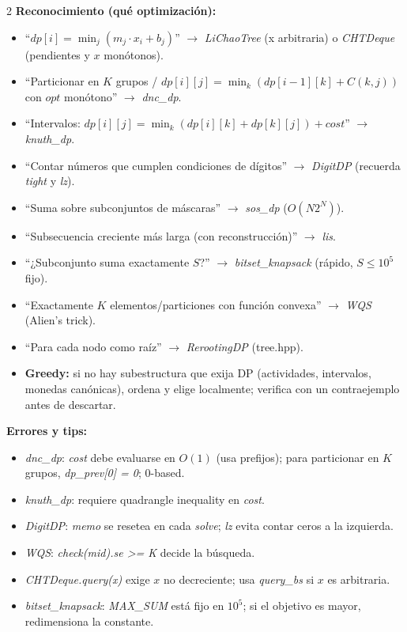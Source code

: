 \documentclass[10pt]{article}
\begin{document}
\begin{multicols}{2}
\textbf{Reconocimiento (qué optimización):}
\begin{itemize}\setlength{\itemsep}{1pt}
  \item ``$dp[i] = \min_j (m_j \cdot x_i + b_j)$'' $\to$ \textit{LiChaoTree} (x arbitraria) o \textit{CHTDeque} (pendientes y $x$ monótonos).
  \item ``Particionar en $K$ grupos / $dp[i][j] = \min_k (dp[i-1][k] + C(k,j))$ con $opt$ monótono'' $\to$ \textit{dnc\_dp}.
  \item ``Intervalos: $dp[i][j] = \min_k(dp[i][k] + dp[k][j]) + cost$'' $\to$ \textit{knuth\_dp}.
  \item ``Contar números que cumplen condiciones de dígitos'' $\to$ \textit{DigitDP} (recuerda \textit{tight} y \textit{lz}).
  \item ``Suma sobre subconjuntos de máscaras'' $\to$ \textit{sos\_dp} ($O(N 2^N)$).
  \item ``Subsecuencia creciente más larga (con reconstrucción)'' $\to$ \textit{lis}.
  \item ``¿Subconjunto suma exactamente $S$?'' $\to$ \textit{bitset\_knapsack} (rápido, $S \le 10^5$ fijo).
  \item ``Exactamente $K$ elementos/particiones con función convexa'' $\to$ \textit{WQS} (Alien's trick).
  \item ``Para cada nodo como raíz'' $\to$ \textit{RerootingDP} (tree.hpp).
  \item \textbf{Greedy:} si no hay subestructura que exija DP (actividades, intervalos, monedas canónicas), ordena y elige localmente; verifica con un contraejemplo antes de descartar.
\end{itemize}

\textbf{Errores y tips:}
\begin{itemize}\setlength{\itemsep}{1pt}
  \item \textit{dnc\_dp}: \textit{cost} debe evaluarse en $O(1)$ (usa prefijos); para particionar en $K$ grupos, \textit{dp\_prev[0] = 0}; 0-based.
  \item \textit{knuth\_dp}: requiere quadrangle inequality en \textit{cost}.
  \item \textit{DigitDP}: \textit{memo} se resetea en cada \textit{solve}; \textit{lz} evita contar ceros a la izquierda.
  \item \textit{WQS}: \textit{check(mid).se >= K} decide la búsqueda.
  \item \textit{CHTDeque.query(x)} exige $x$ no decreciente; usa \textit{query\_bs} si $x$ es arbitraria.
  \item \textit{bitset\_knapsack}: \textit{MAX\_SUM} está fijo en $10^5$; si el objetivo es mayor, redimensiona la constante.
\end{itemize}


\end{multicols}
\end{document}
